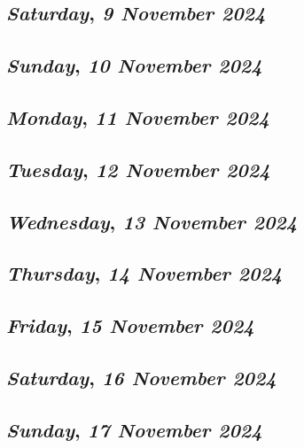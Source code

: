 \def\day{\textit{9 November 2024}}
\def\weekday{\textit{Saturday}}
\subsection*{\weekday, \day}

\def\day{\textit{10 November 2024}}
\def\weekday{\textit{Sunday}}
\subsection*{\weekday, \day}

\def\day{\textit{11 November 2024}}
\def\weekday{\textit{Monday}}
\subsection*{\weekday, \day}

\def\day{\textit{12 November 2024}}
\def\weekday{\textit{Tuesday}}
\subsection*{\weekday, \day}

\def\day{\textit{13 November 2024}}
\def\weekday{\textit{Wednesday}}
\subsection*{\weekday, \day}

\def\day{\textit{14 November 2024}}
\def\weekday{\textit{Thursday}}
\subsection*{\weekday, \day}

\def\day{\textit{15 November 2024}}
\def\weekday{\textit{Friday}}
\subsection*{\weekday, \day}

\def\day{\textit{16 November 2024}}
\def\weekday{\textit{Saturday}}
\subsection*{\weekday, \day}

\def\day{\textit{17 November 2024}}
\def\weekday{\textit{Sunday}}
\subsection*{\weekday, \day}

